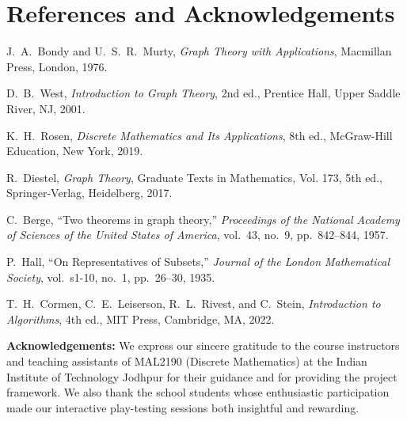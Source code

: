 \documentclass[11pt,a4paper]{article}
\begin{document}
\section{References and Acknowledgements}
\begin{enumerate}[label={[\arabic*]}]
  \item J.~A.~Bondy and U.~S.~R.~Murty, \emph{Graph Theory with Applications}, Macmillan Press, London, 1976.
  \item D.~B.~West, \emph{Introduction to Graph Theory}, 2nd ed., Prentice Hall, Upper Saddle River, NJ, 2001.
  \item K.~H.~Rosen, \emph{Discrete Mathematics and Its Applications}, 8th ed., McGraw-Hill Education, New York, 2019.
  \item R.~Diestel, \emph{Graph Theory}, Graduate Texts in Mathematics, Vol. 173, 5th ed., Springer-Verlag, Heidelberg, 2017.
  \item C.~Berge, ``Two theorems in graph theory,'' \emph{Proceedings of the National Academy of Sciences of the United States of America}, vol.~43, no.~9, pp.~842--844, 1957.
  \item P.~Hall, ``On Representatives of Subsets,'' \emph{Journal of the London Mathematical Society}, vol.~s1-10, no.~1, pp.~26--30, 1935.
  \item T.~H.~Cormen, C.~E.~Leiserson, R.~L.~Rivest, and C.~Stein, \emph{Introduction to Algorithms}, 4th ed., MIT Press, Cambridge, MA, 2022.
\end{enumerate}

\textbf{Acknowledgements:} We express our sincere gratitude to the course instructors and teaching assistants of MAL2190 (Discrete Mathematics) at the Indian Institute of Technology Jodhpur for their guidance and for providing the project framework. We also thank the school students whose enthusiastic participation made our interactive play-testing sessions both insightful and rewarding.
\end{document}
